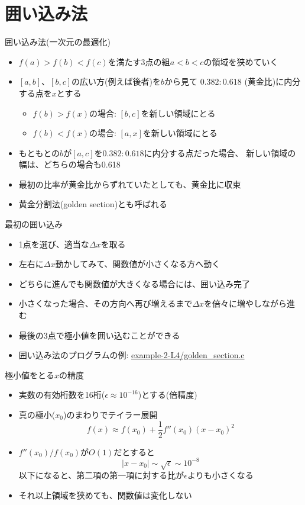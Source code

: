 \section{囲い込み法}

\begin{frame}[t,fragile]{囲い込み法(一次元の最適化)}
  \begin{itemize}
    \setlength{\itemsep}{1em}
  \item $f(a) > f(b) < f(c)$を満たす3点の組$a < b < c$の領域を狭めていく
  \item $[a,b]$、$[b,c]$の広い方(例えば後者)を$b$から見て
    $0.382:0.618$ (黄金比)に内分する点を$x$とする
    \begin{itemize}
    \item $f(b) > f(x)$の場合: $[b,c]$を新しい領域にとる
    \item $f(b) < f(x)$の場合: $[a,x]$を新しい領域にとる
    \end{itemize}
  \item もともとの$b$が$[a,c]$を$0.382:0.618$に内分する点だった場合、
    新しい領域の幅は、どちらの場合も0.618
  \item 最初の比率が黄金比からずれていたとしても、黄金比に収束
  \item 黄金分割法(golden section)とも呼ばれる
  \end{itemize}
\end{frame}

\begin{frame}[t,fragile]{最初の囲い込み}
  \begin{itemize}
    \setlength{\itemsep}{1em}
  \item 1点を選び、適当な$\Delta x$を取る
  \item 左右に$\Delta x$動かしてみて、関数値が小さくなる方へ動く
  \item どちらに進んでも関数値が大きくなる場合には、囲い込み完了
  \item 小さくなった場合、その方向へ再び増えるまで$\Delta x$を倍々に増やしながら進む
  \item 最後の3点で極小値を囲い込むことができる
  \item 囲い込み法のプログラムの例: \href{https://github.com/todo-group/computer-experiments/blob/master/exercise/optimization/golden_section.c}{example-2-L4/golden\_section.c}
  \end{itemize}
\end{frame}

\begin{frame}[t,fragile]{極小値をとる$x$の精度}
  \begin{itemize}
    \setlength{\itemsep}{1em}
  \item 実数の有効桁数を16桁($\epsilon \approx 10^{-16}$)とする(倍精度)
  \item 真の極小($x_0$)のまわりでテイラー展開
    \[
    f(x) \approx f(x_0) + \frac{1}{2} f''(x_0) (x-x_0)^2
    \]
  \item $f''(x_0) / f(x_0)$が$O(1)$だとすると
    \[
    |x-x_0| \sim \sqrt{\epsilon} \sim 10^{-8}
    \]
    以下になると、第二項の第一項に対する比が$\epsilon$よりも小さくなる
  \item それ以上領域を狭めても、関数値は変化しない
  \end{itemize}
\end{frame}
